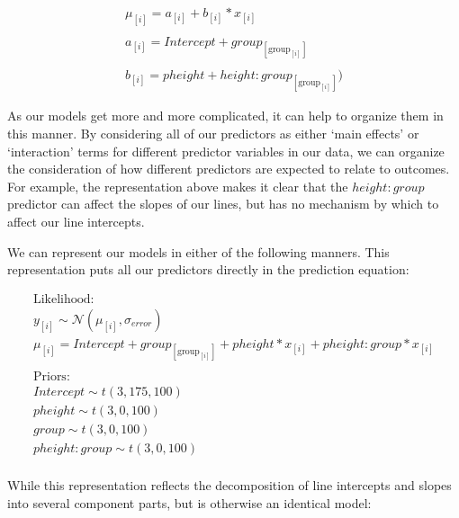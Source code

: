 \documentclass[
]{book}
\begin{document}
\begin{equation}
\begin{split}
\mu_{[i]} = a_{[i]} + b_{[i]} * x_{[i]}  \\\\
a_{[i]} = Intercept + group_{[\mathrm{group}_{[i]}]} \\\\
b_{[i]} = pheight + height \colon group_{[\mathrm{group}_{[i]}]}) 
\end{split}
\label{eq:514}
\end{equation}

As our models get more and more complicated, it can help to organize them in this manner. By considering all of our predictors as either `main effects' or `interaction' terms for different predictor variables in our data, we can organize the consideration of how different predictors are expected to relate to outcomes. For example, the representation above makes it clear that the \(height \colon group\) predictor can affect the slopes of our lines, but has no mechanism by which to affect our line intercepts.

We can represent our models in either of the following manners. This representation puts all our predictors directly in the prediction equation:

\begin{equation}
\begin{split}
\textrm{Likelihood:} \\
y_{[i]} \sim \mathcal{N}(\mu_{[i]},\sigma_{error}) \\
\mu_{[i]} = Intercept + group_{[\mathrm{group}_{[i]}]} + pheight * x_{[i]} + pheight \colon group * x_{[i]}  \\ \\
\textrm{Priors:} \\
Intercept \sim t(3, 175, 100) \\
pheight \sim t(3, 0, 100) \\ 
group \sim t(3, 0, 100) \\ 
pheight \colon group \sim t(3, 0, 100) \\ 
\end{split}
\label{eq:515}
\end{equation}

While this representation reflects the decomposition of line intercepts and slopes into several component parts, but is otherwise an identical model:
\end{document}

